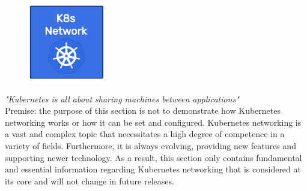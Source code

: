 \begin{figure}
  \centering
  \includegraphics[width=\linewidth]{images/architecture/k8s_network.pdf}
\end{figure}

\textit{"Kubernetes is all about sharing machines between applications"}\cite{k8s_cluster_networking}
\\ %

Premise: the purpose of this section is not to demonstrate how Kubernetes networking
works or how it can be set and configured. Kubernetes networking is a vast and
complex topic that necessitates a high degree of competence in a variety of
fields. Furthermore, it is always evolving, providing new features and supporting
newer technology. As a result, this section only contains fundamental and essential
information regarding Kubernetes networking that is considered at its core and will
not change in future releases.

